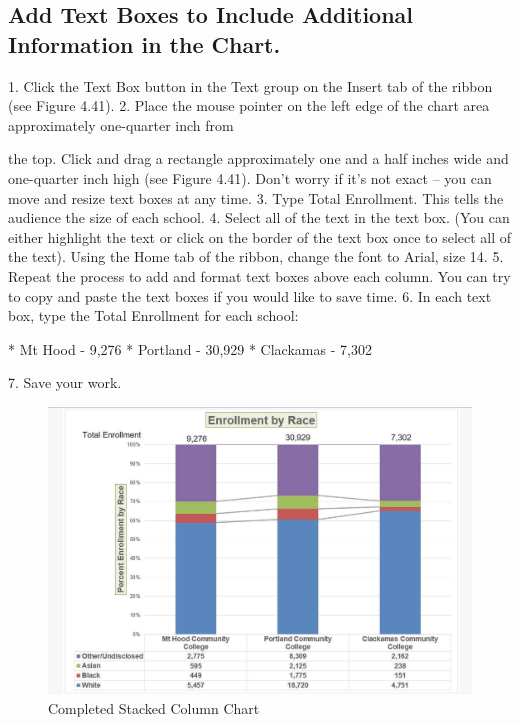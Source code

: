 \subsection{Add Text Boxes to Include Additional Information in the Chart.}

1. Click the Text Box button in the Text group on the Insert tab of the ribbon (see Figure 4.41).
2. Place the mouse pointer on the left edge of the chart area approximately one-quarter inch from

the top. Click and drag a rectangle approximately one and a half inches wide and one-quarter
inch high (see Figure 4.41). Don’t worry if it’s not exact – you can move and resize text boxes at
any time.
3.   Type Total Enrollment. This tells the audience the size of each school.
4.   Select all of the text in the text box. (You can either highlight the text or click on the border of
the text box once to select all of the text). Using the Home tab of the ribbon, change the font to
Arial, size 14.
5.   Repeat the process to add and format text boxes above each column. You can try to copy and
paste the text boxes if you would like to save time.
6.   In each text box, type the Total Enrollment for each school:

* Mt Hood - 9,276
* Portland - 30,929
* Clackamas - 7,302

7. Save your work.


\begin{figure}[H]
	\centering
	\includegraphics[width=\maxwidth{.95\linewidth}]{gfx/ch04_fig42}
	\caption{Completed Stacked Column Chart}
	\label{04:fig42}
\end{figure}


